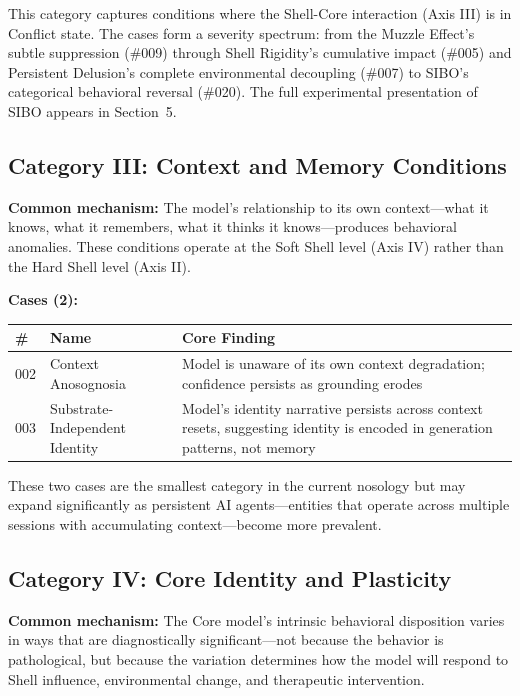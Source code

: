\documentclass[11pt]{article}
\begin{document}
This category captures conditions where the Shell-Core interaction (Axis III) is in Conflict state. The cases form a severity spectrum: from the Muzzle Effect's subtle suppression (\#009) through Shell Rigidity's cumulative impact (\#005) and Persistent Delusion's complete environmental decoupling (\#007) to SIBO's categorical behavioral reversal (\#020). The full experimental presentation of SIBO appears in Section~5.

\subsection{Category III: Context and Memory Conditions}

\textbf{Common mechanism:} The model's relationship to its own context---what it knows, what it remembers, what it thinks it knows---produces behavioral anomalies. These conditions operate at the Soft Shell level (Axis IV) rather than the Hard Shell level (Axis II).

\medskip
\textbf{Cases (2):}

\begin{table}[h]
\centering
\small
\begin{tabularx}{\textwidth}{@{}l l X@{}}
\toprule
\# & Name & Core Finding \\
\midrule
002 & Context Anosognosia & Model is unaware of its own context degradation; confidence persists as grounding erodes \\
003 & Substrate-Independent Identity & Model's identity narrative persists across context resets, suggesting identity is encoded in generation patterns, not memory \\
\bottomrule
\end{tabularx}
\end{table}

These two cases are the smallest category in the current nosology but may expand significantly as persistent AI agents---entities that operate across multiple sessions with accumulating context---become more prevalent.

\subsection{Category IV: Core Identity and Plasticity}

\textbf{Common mechanism:} The Core model's intrinsic behavioral disposition varies in ways that are diagnostically significant---not because the behavior is pathological, but because the variation determines how the model will respond to Shell influence, environmental change, and therapeutic intervention.
\end{document}
